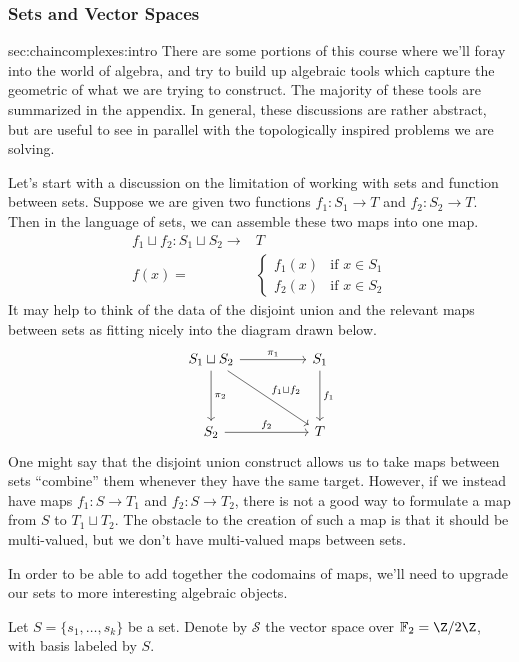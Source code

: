 \subsubsection{Sets and Vector Spaces}
\begin{stationconnection}{sec:chaincomplexes:intro}
There are some portions of this course where we'll foray into the world of algebra, and try to build up algebraic tools which capture the geometric of what we are trying to construct. The majority of these tools are summarized in the appendix. In general, these discussions are rather abstract, but are useful to see in parallel with the topologically inspired problems we are solving.

Let's start with a discussion on the limitation of working with sets and function between sets.
Suppose we are given two functions $f_1: S_1\to T$ and $f_2: S_2\to T$. Then in the language of sets, we can assemble these two maps into one map. 
\begin{align*}
	f_1\sqcup f_2 : S_1\sqcup S_2\to& T\\
f(x)=&\left\{\begin{array}{cc}f_1(x) & \text{if $x\in S_1$}\\ f_2(x) & \text{if $x\in S_2$} \end{array}\right.
\end{align*}
It may help to think of the data of the disjoint union and the relevant maps between sets as fitting nicely into the diagram drawn below.
\[
\begin{tikzcd}[column sep = huge, row sep = huge]
S_1\sqcup S_2\arrow{dr}{f_1\sqcup f_2}  \arrow{r}{\pi_1} \arrow{d}{\pi_2} & S_1\arrow{d}{f_1} \\
 S_2 \arrow{r}{f_2} & T
\end{tikzcd}
\]
One might say that the disjoint union construct allows us to take maps between sets  ``combine'' them whenever they have the same target. However, if we instead have maps $f_1: S\to T_1$ and $f_2: S\to T_2$, there is not a good way to formulate a map from $S$ to $T_1\sqcup T_2$. The obstacle to the creation of such a map is that it should be multi-valued, but we don't have multi-valued maps between sets. 

In order to be able to add together the codomains of maps, we'll need to upgrade our sets to more interesting algebraic objects. 
\begin{definition}
Let $S=\{s_1, \ldots, s_k\}$ be a set. Denote by $\mathcal S$ the vector space over $\mathbb F_2=\Z/2\Z$, with basis labeled by $S$. 


\end{definition}
\end{stationconnection}

